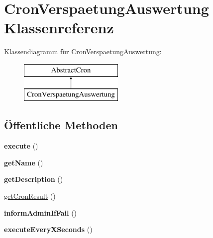 \hypertarget{class_cron_verspaetung_auswertung}{}\section{Cron\+Verspaetung\+Auswertung Klassenreferenz}
\label{class_cron_verspaetung_auswertung}
Klassendiagramm für Cron\+Verspaetung\+Auswertung\+:\begin{figure}[H]
\begin{center}
\leavevmode
\includegraphics[height=2.000000cm]{class_cron_verspaetung_auswertung}
\end{center}
\end{figure}
\subsection*{Öffentliche Methoden}
\begin{DoxyCompactItemize}
\item 
\mbox{\label{class_cron_verspaetung_auswertung_a3690fffe1e7c76edd53f7fb7f1419ab1}} 
{\bfseries execute} ()
\item 
\mbox{\label{class_cron_verspaetung_auswertung_a4d6f8c9b9f983ec1cbcb6906ab1df920}} 
{\bfseries get\+Name} ()
\item 
\mbox{\label{class_cron_verspaetung_auswertung_a02148288a1c2506bb3669cb156635845}} 
{\bfseries get\+Description} ()
\item 
\mbox{\hyperlink{class_cron_verspaetung_auswertung_a7c0b5dffb3075557eb6af58f18e7eb5c}{get\+Cron\+Result}} ()
\item 
\mbox{\label{class_cron_verspaetung_auswertung_a0da0103120194ae295cef82702376edd}} 
{\bfseries inform\+Admin\+If\+Fail} ()
\item 
\mbox{\label{class_cron_verspaetung_auswertung_ab8a6de0e62ef7b3328ad34c410a32e30}} 
{\bfseries execute\+Every\+X\+Seconds} ()
\end{DoxyCompactItemize}


